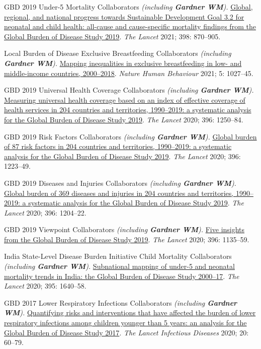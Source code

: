 \documentclass[11pt,article,oneside]{memoir}
\begin{document}
\ind GBD 2019 Under-5 Mortality Collaborators \emph{(including \textbf{Gardner WM}).} \href{https://doi.org/10.1016/S0140-6736(21)01207-1}{Global, regional, and national progress
towards Sustainable Development Goal 3.2 for neonatal and child health: all-cause and cause-specific
mortality findings from the Global Burden of Disease Study 2019}. \emph{The Lancet} 2021; 398: 870--905.

\ind Local Burden of Disease Exclusive Breastfeeding Collaborators \emph{(including \textbf{Gardner WM}).} \href{https://doi.org/10.1038/s41562-021-01108-6}{Mapping inequalities
in exclusive breastfeeding in low- and middle-income countries, 2000--2018}. \emph{Nature Human Behaviour} 2021; 5: 1027--45.

\ind GBD 2019 Universal Health Coverage Collaborators \emph{(including \textbf{Gardner WM}).} \href{https://doi.org/10.1016/S0140-6736(20)30750-9}{Measuring universal health
coverage based on an index of effective coverage of health services in 204 countries and territories, 1990--2019: a 
systematic analysis for the Global Burden of Disease Study 2019}. \emph{The Lancet} 2020; 396: 1250--84.

\ind GBD 2019 Risk Factors Collaborators \emph{(including \textbf{Gardner WM}).} \href{https://doi.org/10.1016/S0140-6736(20)30752-2}{Global burden of 87 risk factors in 204
countries and territories, 1990--2019: a systematic analysis for the Global Burden of Disease Study 2019}. \emph{The Lancet} 2020; 396: 1223--49.

\ind GBD 2019 Diseases and Injuries Collaborators \emph{(including \textbf{Gardner WM}).} \href{https://doi.org/10.1016/S0140-6736(20)30925-9}{Global burden of 369 diseases and
injuries in 204 countries and territories, 1990--2019: a systematic analysis for the Global Burden of Disease
Study 2019}. \emph{The Lancet} 2020; 396: 1204--22.

\ind GBD 2019 Viewpoint Collaborators \emph{(including \textbf{Gardner WM}).} \href{https://doi.org/10.1016/S0140-6736(20)31404-5}{Five insights from the Global Burden of Disease Study 2019}. 
\emph{The Lancet} 2020; 396: 1135--59.

\ind India State-Level Disease Burden Initiative Child Mortality Collaborators \emph{(including \textbf{Gardner WM}).} \href{https://doi.org/10.1016/S0140-6736(20)30471-2}{Subnational mapping of under-5 and neonatal mortality trends in India: the Global Burden of Disease Study
2000--17}. \emph{The Lancet} 2020; 395: 1640--58.

\ind GBD 2017 Lower Respiratory Infections Collaborators \emph{(including \textbf{Gardner WM}).} \href{https://doi.org/10.1016/S1473-3099(19)30410-4}{Quantifying risks and interventions that have affected
the burden of lower respiratory infections among children younger than 5 years: an analysis for the Global
Burden of Disease Study 2017}. \emph{The Lancet Infectious Diseases} 2020; 20: 60--79.
\end{document}
